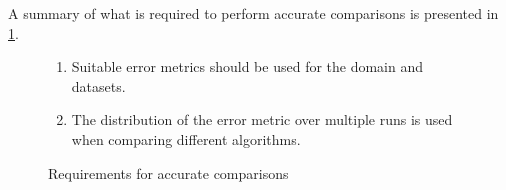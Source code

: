 A summary of what is required to perform accurate comparisons is presented in \ref{fig:accurate_requirements}.

\begin{figure}[h]
    \begin{enumerate}
        \item Suitable error metrics should be used for the domain and datasets.
        \item The distribution of the error metric over multiple runs is used when comparing different algorithms.
    \end{enumerate}
    \caption{Requirements for accurate comparisons}
    \label{fig:accurate_requirements}
\end{figure}






